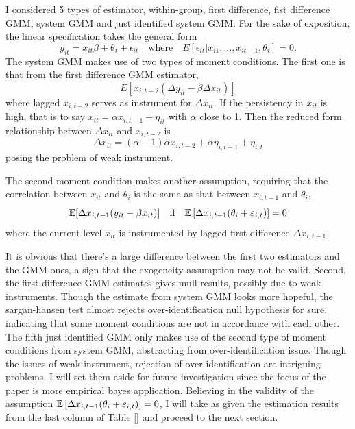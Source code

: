 \documentclass[12pt]{article}
\begin{document}
I considered 5 types of estimator, within-group, first difference, fist
difference GMM, system GMM and just identified system GMM. For the sake of
exposition, the linear specification takes the general form \[
    y_{it} = x_{it} \beta +\theta_i + \epsilon_{it}\quad \text{where} \quad E[\epsilon_{it}|x_{i1},\ldots, x_{it-1},\theta_i]=0.
\]
The system GMM makes use of two types of moment conditions. The first one is
that from the first difference GMM estimator,
\[E[x_{i,t-2}(\Delta y_{it}-\beta\Delta x_{it})]\]
where lagged $x_{i,t-2}$ serves as instrument for $\Delta x_{it}$. If the
persistency in $x_{it}$ is high, that is to say $x_{it}=\alpha
    x_{i,t-1}+\eta_{it}$ with $\alpha$ close to 1. Then the reduced form
relationship between $\Delta x_{it}$ and $x_{i,t-2}$ is
\[\Delta x_{it} = (\alpha-1)\alpha x_{i,t-2}+\alpha \eta_{i,t-1}+\eta_{i,t}\]
posing the problem of weak instrument.

The second moment condition makes another assumption, requiring that the
correlation between $x_{it}$ and $\theta_i$ is the same as that between
$x_{i,t-1}$ and $\theta_i$,
\begin{equation*}
    \mathbb{E}[\Delta x_{i,t-1}(y_{it}-\beta x_{it})] \quad \text{if}\quad \mathbb{E}\left[\Delta x_{i,t-1}(\theta_i+\varepsilon_{i,t})\right]=0
\end{equation*} where the current level $x_{it}$ is instrumented by lagged first difference $\Delta x_{i,t-1}$.

It is obvious that there's a large difference between the first two estimators
and the GMM ones, a sign that the exogeneity assumption may not be valid.
Second, the first difference GMM estimates gives mull results, possibly due to
weak instruments. Though the estimate from system GMM looks more hopeful, the
sargan-hansen test almost rejects over-identification null hypothesis for sure,
indicating that some moment conditions are not in accordance with each other.
The fifth just identified GMM only makes use of the second type of moment
conditions from system GMM, abstracting from over-identification issue. Though
the issues of weak instrument, rejection of over-identification are intriguing
problems, I will set them aside for future investigation since the focus of the
paper is more empirical bayes application. Believing in the validity of the
assumption $\mathbb{E}\left[\Delta x_{i,t-1}(\theta_i+\varepsilon_{i,t})\right]=0$, I will
take as given the estimation results from the last column of Table \ref{} and
proceed to the next section.

\begin{table}
    \label{tab:reg_wg_fd_gmm}
    
\end{table}
\end{document}
